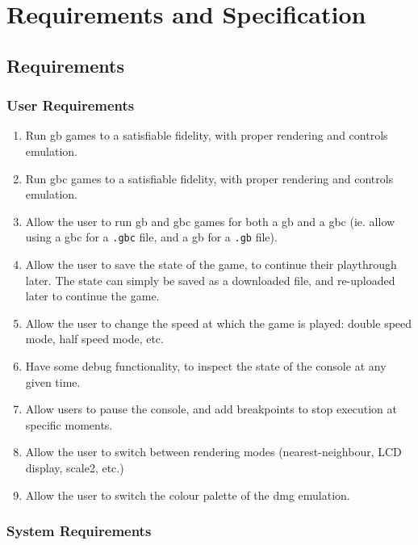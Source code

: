 \documentclass[11pt]{informatics-report}
\begin{document}
\chapter{Requirements and Specification}

\section{Requirements}

\subsection{User Requirements}

\begin{enumerate}[start=1,label=U\arabic*.]
    \item Run \glsdesc{gb} games to a satisfiable fidelity, with proper rendering and controls emulation.
    \item Run \glsdesc{gbc} games to a satisfiable fidelity, with proper rendering and controls emulation.
    \item Allow the user to run \gls{gb} and \gls{gbc} games for both a \glsdesc{gb} and a \glsdesc{gbc} (ie. allow using a \gls{gbc} for a \texttt{.gbc} file, and a \gls{gb} for a \texttt{.gb} file).
    \item Allow the user to save the state of the game, to continue their playthrough later. The state can simply be saved as a downloaded file, and re-uploaded later to continue the game.
    \item Allow the user to change the speed at which the game is played: double speed mode, half speed mode, etc.
    \item Have some debug functionality, to inspect the state of the console at any given time.
    \item Allow users to pause the console, and add breakpoints to stop execution at specific moments.
    \item Allow the user to switch between rendering modes (nearest-neighbour, LCD display, scale2, etc.)
    \item Allow the user to switch the colour palette of the \gls{dmg} emulation.
\end{enumerate}

\subsection{System Requirements}
\end{document}
